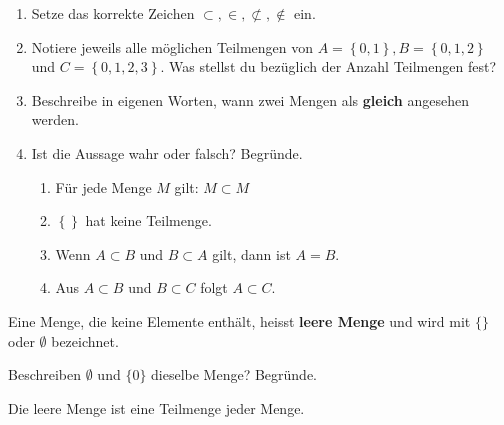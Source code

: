 \documentclass[11pt,oneside]{article}
\begin{document}
    \begin{aufgabe}
    	\begin{enumerate}
    		\item Setze das korrekte Zeichen $\subset, \in, \nsubset, \nin$ ein.
    		\item Notiere jeweils alle möglichen Teilmengen von $A=\left\{0,1\right\}, B=\left\{0,1,2\right\}$ und $C=\left\{0,1,2,3\right\}$. Was stellst du bezüglich der Anzahl Teilmengen fest?
    		\item Beschreibe in eigenen Worten, wann zwei Mengen als \textbf{gleich} angesehen werden.
    		\item Ist die Aussage wahr oder falsch? Begründe.
    		\begin{enumerate}[label=\alph*)]
    			\item Für jede Menge $M$ gilt: $M\subset M$
    			\item $\left\{\right\}$ hat keine Teilmenge.
    			\item Wenn $A\subset B$ und $B\subset A$ gilt, dann ist $A=B$.
    			\item Aus $A\subset B$ und $B\subset C$ folgt $A\subset C$.
    		\end{enumerate}
    	\end{enumerate}
    \end{aufgabe}
    \begin{definition}
        Eine Menge, die keine Elemente enthält, heisst \textbf{leere Menge} und wird mit $\{\}$ oder $\emptyset$ bezeichnet.
    \end{definition}
    \begin{aufgabe}
        Beschreiben $\emptyset$ und $\{0\}$ dieselbe Menge? Begründe.\vspace{5pt}\newline{}
    \end{aufgabe}
    \begin{satz}
        Die leere Menge ist eine Teilmenge jeder Menge.
    \end{satz}
\end{document}
